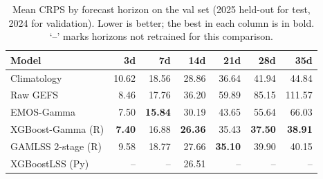 \begin{table}[H]
\centering
\small
\begin{tabular}{lrrrrrr}
\toprule
Model & 3d & 7d & 14d & 21d & 28d & 35d \\
\midrule
Climatology & 10.62 & 18.56 & 28.86 & 36.64 & 41.94 & 44.84 \\
Raw GEFS & 8.46 & 17.76 & 36.20 & 59.89 & 85.15 & 111.57 \\
EMOS-Gamma & 7.50 & \textbf{15.84} & 30.19 & 43.65 & 55.64 & 66.03 \\
XGBoost-Gamma (R) & \textbf{7.40} & 16.88 & \textbf{26.36} & 35.43 & \textbf{37.50} & \textbf{38.91} \\
GAMLSS 2-stage (R) & 9.58 & 18.77 & 27.66 & \textbf{35.10} & 39.90 & 40.15 \\
XGBoostLSS (Py) & -- & -- & 26.51 & -- & -- & -- \\
\bottomrule
\end{tabular}
\caption{Mean CRPS by forecast horizon on the val set (2025 held-out for test, 2024 for validation). Lower is better; the best in each column is in bold. `--' marks horizons not retrained for this comparison.}
\label{tab:comparison-crps-val}
\end{table}
